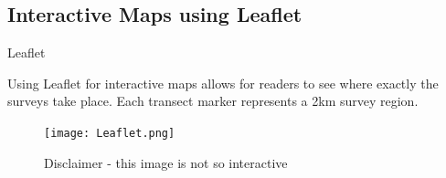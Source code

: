 \documentclass{beamer}
\begin{document}
             \subsection{Interactive Maps using Leaflet}
                 \begin{frame}{Leaflet}

                    Using Leaflet \cite{leaflet} for interactive maps allows for readers to see where exactly the surveys take place. Each transect marker represents a 2km survey region.

                     \begin{figure}
                        \centering
                        \texttt{[image: Leaflet.png]}
                        \caption{Disclaimer - this image is not so interactive }
                     \end{figure}
                 \end{frame}
\end{document}
